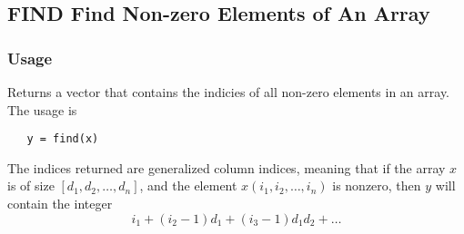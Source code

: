 %
%
%
\subsection{FIND Find Non-zero Elements of An Array}
\subsubsection{Usage}
Returns a vector that contains the indicies of all non-zero elements 
in an array.  The usage is
\begin{verbatim}
   y = find(x)
\end{verbatim}
The indices returned are generalized column indices, meaning that if 
the array $x$ is of size $[d_1,d_2,\ldots,d_n]$, and the
element $x(i_1,i_2,\ldots,i_n)$ is nonzero, then $y$
will contain the integer
\[
   i_1 + (i_2-1) d_1 + (i_3-1) d_1 d_2 + \dots
\]
